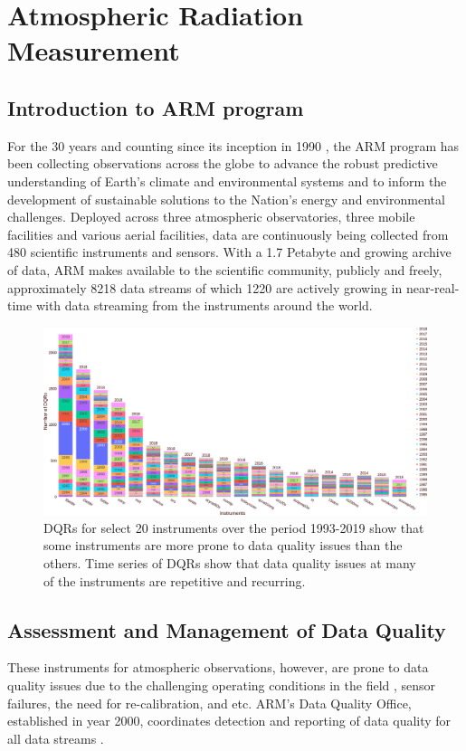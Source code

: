 \section{Atmospheric Radiation Measurement}
\subsection{Introduction to ARM program}
For the 30 years and counting since its inception in 1990
\cite{Turner_AMS_2016}, the ARM program has
been collecting observations across the globe to advance the robust
predictive understanding of Earth's climate and environmental systems
and to inform the development of sustainable solutions to the Nation's
energy and environmental challenges. Deployed across three atmospheric
observatories, three mobile facilities and various aerial facilities, data are
continuously being collected from 480 scientific instruments and
sensors. With a 1.7 Petabyte and growing archive of data, ARM makes
available to the scientific community, publicly and freely,
approximately 8218 data streams of which 1220 are actively growing in
near-real-time with data streaming from the instruments around the
world.

\begin{figure}
 \includegraphics[width=\linewidth]{figures/dqr_by_instrument_20.png}
 \caption{DQRs for select 20 instruments over the period 1993-2019 show
 that some instruments are more prone to data quality issues than
 the others. Time series of DQRs show that data quality issues at many
 of the instruments are repetitive and recurring.}
 \label{fig:dqr_by_instrument}
\end{figure}


\subsection{Assessment and Management of Data Quality}
These instruments for atmospheric observations, however, are prone to data quality issues due to
the challenging operating conditions in the field
, sensor failures, the need for
re-calibration, and etc. ARM's Data Quality Office, established in year 2000,
coordinates detection and reporting of data quality for all data streams
\cite{Peppler_AMS_2016,peppler2005,peppler2008quality}.


